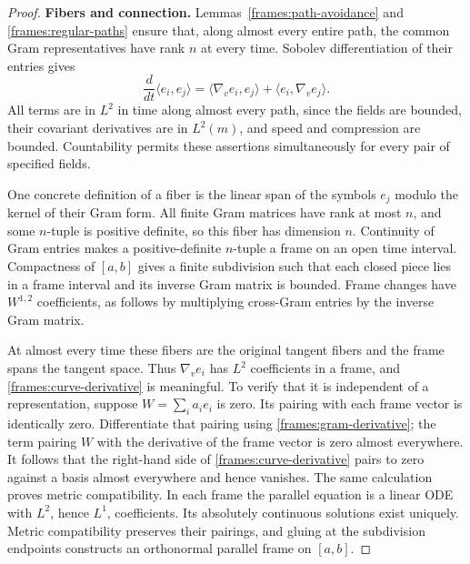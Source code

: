 \begin{proof}
 \textbf{Fibers and connection.}
 Lemmas~\ref{frames:path-avoidance} and
 \ref{frames:regular-paths} ensure that, along almost every entire
 path, the common Gram representatives have rank $n$ at every
 time.  Sobolev differentiation of their entries gives
 \begin{equation}\label{frames:gram-derivative}
  \frac{d}{dt}\langle e_i,e_j\rangle
       =\langle\nabla_v e_i,e_j\rangle
                     +\langle e_i,\nabla_v e_j\rangle.
 \end{equation}
 All terms are in $L^2$ in time along almost every path, since
 the fields are bounded, their covariant derivatives are in
 $L^2(m)$, and speed and compression are bounded.
 Countability permits these assertions simultaneously for every
 pair of specified fields.

 One concrete definition of a fiber is the linear span of the
 symbols $e_j$ modulo the kernel of their Gram form.  All finite
 Gram matrices have rank at most $n$, and some $n$-tuple is
 positive definite, so this fiber has dimension $n$.
 Continuity of Gram entries makes a positive-definite $n$-tuple
 a frame on an open time interval.  Compactness of $[a,b]$
 gives a finite subdivision such that each closed piece lies
 in a frame interval and its inverse Gram matrix is bounded.
 Frame changes have $W^{1,2}$ coefficients, as follows by
 multiplying cross-Gram entries by the inverse Gram matrix.

 At almost every time these fibers are the original tangent
 fibers and the frame spans the tangent space.
 Thus $\nabla_v e_i$ has $L^2$ coefficients in a frame, and
 \eqref{frames:curve-derivative} is meaningful.
 To verify that it is independent of a representation, suppose
 $W=\sum_i a_ie_i$ is zero.  Its pairing with each frame vector
 is identically zero.  Differentiate that pairing using
 \eqref{frames:gram-derivative}; the term pairing $W$ with the
 derivative of the frame vector is zero almost everywhere.
 It follows that the right-hand side of
 \eqref{frames:curve-derivative} pairs to zero against a basis
 almost everywhere and hence vanishes.  The same calculation
 proves metric compatibility.
 In each frame the parallel equation is a linear ODE with
 $L^2$, hence $L^1$, coefficients.  Its absolutely continuous
 solutions exist uniquely.  Metric compatibility preserves
 their pairings, and gluing at the subdivision endpoints
 constructs an orthonormal parallel frame on $[a,b]$.


\end{proof}
